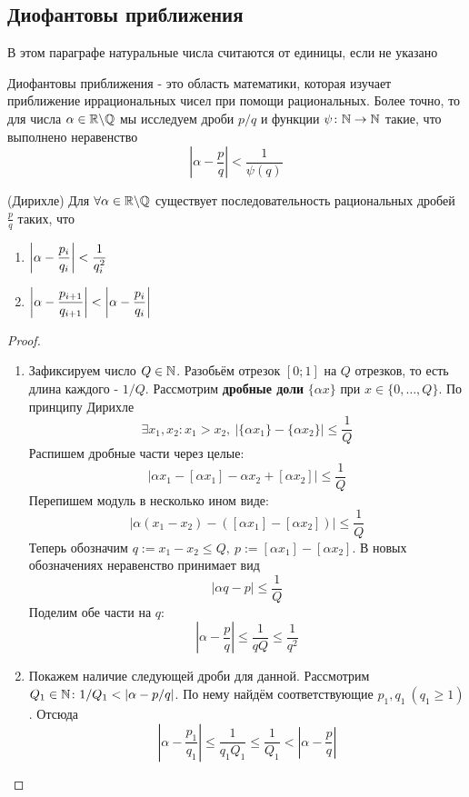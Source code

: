 \subsection{Диофантовы приближения}

\begin{note}
	В этом параграфе натуральные числа считаются от единицы, если не указано
\end{note}

Диофантовы приближения - это область математики, которая изучает приближение иррациональных чисел при помощи рациональных. Более точно, то для числа $\alpha \in \mathbb{R} \backslash \mathbb{Q}$ мы исследуем дроби $p/q$ и функции $\psi \colon \mathbb{N} \to \mathbb{N}$ такие, что выполнено неравенство
\[
	\left|\alpha - \frac{p}{q}\right| < \frac{1}{\psi(q)}
\]

\begin{theorem} (Дирихле)
	Для $\forall \alpha \in \mathbb{R} \backslash \mathbb{Q}$ существует последовательность рациональных дробей $\frac{p}{q}$ таких, что
	\begin{enumerate}
		\item \(\displaystyle \left|\alpha - \frac{p_i}{q_i}\right| < \frac{1}{q_i^2}\)
		
		\item \(\displaystyle \left|\alpha - \frac{p_{i + 1}}{q_{i + 1}}\right| < \left|\alpha - \frac{p_i}{q_i}\right|\)
	\end{enumerate}
\end{theorem}

\begin{proof}~
	\begin{enumerate}
		\item Зафиксируем число $Q \in \mathbb{N}$. Разобьём отрезок $[0; 1]$ на $Q$ отрезков, то есть длина каждого - $1 / Q$. Рассмотрим \textbf{дробные доли} $\{\alpha x\}$ при $x \in \{0, \ldots, Q\}$. По принципу Дирихле
		\[
			\exists x_1, x_2 \colon x_1 > x_2,\ |\{\alpha x_1\} - \{\alpha x_2\}| \le \frac{1}{Q}
		\]
		Распишем дробные части через целые:
		\[
			|\alpha x_1 - [\alpha x_1] - \alpha x_2 + [\alpha x_2]| \le \frac{1}{Q}
		\]
		Перепишем модуль в несколько ином виде:
		\[
			|\alpha(x_1 - x_2) - ([\alpha x_1] - [\alpha x_2])| \le \frac{1}{Q}
		\]
		Теперь обозначим $q := x_1 - x_2 \le Q,\ p := [\alpha x_1] - [\alpha x_2]$. В новых обозначениях неравенство принимает вид
		\[
			|\alpha q - p| \le \frac{1}{Q}
		\]
		Поделим обе части на $q$:
		\[
			\left|\alpha - \frac{p}{q}\right| \le \frac{1}{qQ} \le \frac{1}{q^2}
		\]
		
		\item Покажем наличие следующей дроби для данной. Рассмотрим $Q_1 \in \mathbb{N} \colon 1/Q_1 < |\alpha - p/q|$. По нему найдём соответствующие $p_1, q_1\ (q_1 \ge 1)$. Отсюда
		\[
			\left|\alpha - \frac{p_1}{q_1}\right| \le \frac{1}{q_1Q_1} \le \frac{1}{Q_1} < \left|\alpha - \frac{p}{q}\right|
		\]
	\end{enumerate}
\end{proof}

